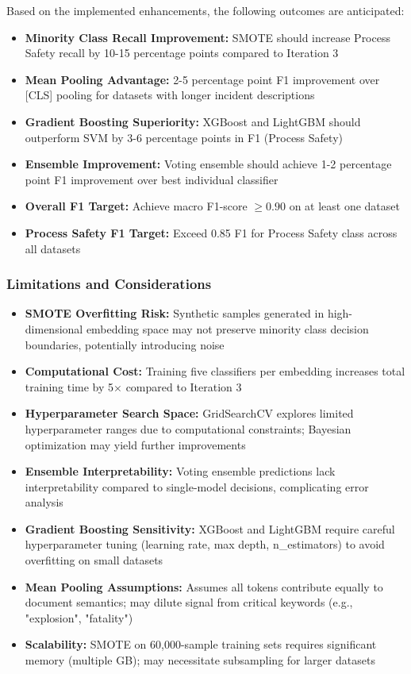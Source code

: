 \documentclass[11pt, titlepage, bibliography=totoc]{scrreprt}
\begin{document}
Based on the implemented enhancements, the following outcomes are anticipated:

\begin{itemize}
    \item \textbf{Minority Class Recall Improvement:} SMOTE should increase Process Safety recall by 10-15 percentage points compared to Iteration 3
    \item \textbf{Mean Pooling Advantage:} 2-5 percentage point F1 improvement over [CLS] pooling for datasets with longer incident descriptions
    \item \textbf{Gradient Boosting Superiority:} XGBoost and LightGBM should outperform SVM by 3-6 percentage points in F1 (Process Safety)
    \item \textbf{Ensemble Improvement:} Voting ensemble should achieve 1-2 percentage point F1 improvement over best individual classifier
    \item \textbf{Overall F1 Target:} Achieve macro F1-score $\geq 0.90$ on at least one dataset
    \item \textbf{Process Safety F1 Target:} Exceed 0.85 F1 for Process Safety class across all datasets
\end{itemize}

\subsubsection{Limitations and Considerations}

\begin{itemize}
    \item \textbf{SMOTE Overfitting Risk:} Synthetic samples generated in high-dimensional embedding space may not preserve minority class decision boundaries, potentially introducing noise
    \item \textbf{Computational Cost:} Training five classifiers per embedding increases total training time by 5$\times$ compared to Iteration 3
    \item \textbf{Hyperparameter Search Space:} GridSearchCV explores limited hyperparameter ranges due to computational constraints; Bayesian optimization may yield further improvements
    \item \textbf{Ensemble Interpretability:} Voting ensemble predictions lack interpretability compared to single-model decisions, complicating error analysis
    \item \textbf{Gradient Boosting Sensitivity:} XGBoost and LightGBM require careful hyperparameter tuning (learning rate, max depth, n\_estimators) to avoid overfitting on small datasets
    \item \textbf{Mean Pooling Assumptions:} Assumes all tokens contribute equally to document semantics; may dilute signal from critical keywords (e.g., "explosion", "fatality")
    \item \textbf{Scalability:} SMOTE on 60,000-sample training sets requires significant memory (multiple GB); may necessitate subsampling for larger datasets
\end{itemize}
\end{document}
